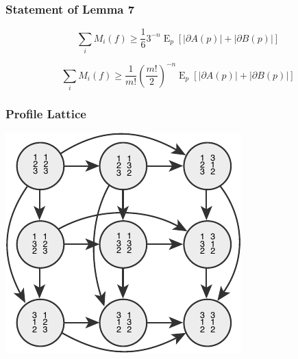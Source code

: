 \documentclass[aspectratio=169]{beamer}
\DeclareMathOperator{\expectedvalue}{E}
\begin{document}
		\begin{frame}
			\frametitle{Statement of Lemma 7}

			\begin{lemma}
				\[
					\sum_i M_i(f) \ge \frac{1}{6} 3^{-n} \expectedvalue_p \left[|\partial A(p)| + |\partial B(p)| \right]
				\]
			\end{lemma}

			\begin{lemma}
				\[
					\sum_i M_i(f) \ge \frac{1}{m!} \left(\frac{m!}{2}\right)^{-n} \expectedvalue_p \left[|\partial A(p)| + |\partial B(p)| \right]
				\]
			\end{lemma}
		\end{frame}

		\begin{frame}
			\frametitle{Profile Lattice}

			\centerline{\includegraphics[height=0.7\paperheight, keepaspectratio]{../figures/profile_lattice.pdf}}
		\end{frame}
\end{document}

